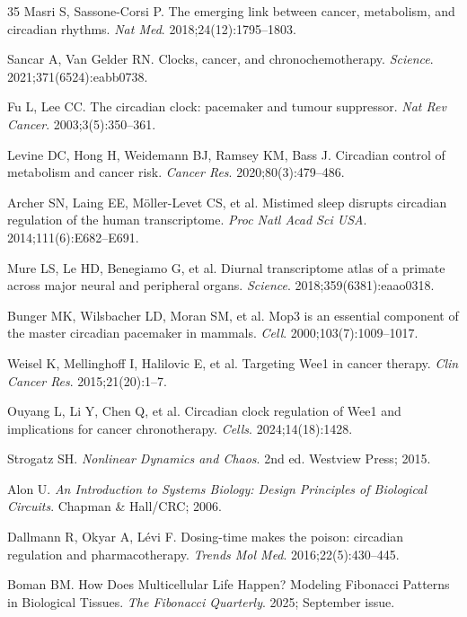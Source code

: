 \documentclass[11pt,letterpaper]{article}
\begin{document}
\begin{thebibliography}{35}
Masri S, Sassone-Corsi P.
The emerging link between cancer, metabolism, and circadian rhythms.
\textit{Nat Med}. 2018;24(12):1795--1803.

Sancar A, Van Gelder RN.
Clocks, cancer, and chronochemotherapy.
\textit{Science}. 2021;371(6524):eabb0738.

Fu L, Lee CC.
The circadian clock: pacemaker and tumour suppressor.
\textit{Nat Rev Cancer}. 2003;3(5):350--361.

Levine DC, Hong H, Weidemann BJ, Ramsey KM, Bass J.
Circadian control of metabolism and cancer risk.
\textit{Cancer Res}. 2020;80(3):479--486.

Archer SN, Laing EE, M{\"o}ller-Levet CS, et al.
Mistimed sleep disrupts circadian regulation of the human transcriptome.
\textit{Proc Natl Acad Sci USA}. 2014;111(6):E682--E691.

Mure LS, Le HD, Benegiamo G, et al.
Diurnal transcriptome atlas of a primate across major neural and peripheral organs.
\textit{Science}. 2018;359(6381):eaao0318.

Bunger MK, Wilsbacher LD, Moran SM, et al.
Mop3 is an essential component of the master circadian pacemaker in mammals.
\textit{Cell}. 2000;103(7):1009--1017.

Weisel K, Mellinghoff I, Halilovic E, et al.
Targeting Wee1 in cancer therapy.
\textit{Clin Cancer Res}. 2015;21(20):1--7.

Ouyang L, Li Y, Chen Q, et al.
Circadian clock regulation of Wee1 and implications for cancer chronotherapy.
\textit{Cells}. 2024;14(18):1428.

Strogatz SH.
\textit{Nonlinear Dynamics and Chaos}. 2nd ed. Westview Press; 2015.

Alon U.
\textit{An Introduction to Systems Biology: Design Principles of Biological Circuits}.
Chapman \& Hall/CRC; 2006.

Dallmann R, Okyar A, L{\'e}vi F.
Dosing-time makes the poison: circadian regulation and pharmacotherapy.
\textit{Trends Mol Med}. 2016;22(5):430--445.

Boman BM.
How Does Multicellular Life Happen? Modeling Fibonacci Patterns in Biological Tissues.
\textit{The Fibonacci Quarterly}. 2025; September issue.


\end{thebibliography}
\end{document}
